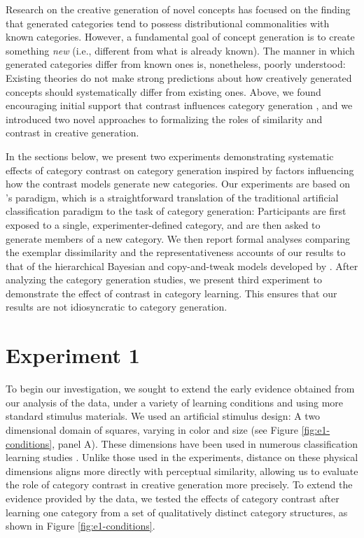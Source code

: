 \documentclass[12pt]{article}
\begin{document}
\begin{flushleft}
Research on the creative generation of novel concepts has focused on the finding
that generated categories tend to possess distributional commonalities with
known categories. However, a fundamental goal of concept generation is to create
something {\em new} (i.e., different from what is already known). The manner in
which generated categories differ from known ones is, nonetheless, poorly
understood: Existing theories do not make strong predictions about how
creatively generated concepts should systematically differ from existing ones.
Above, we found encouraging initial support that contrast influences category
generation \citep[][Experiment 3]{jern2013probabilistic}, and we introduced two
novel approaches to formalizing the roles of similarity and contrast in creative
generation.

In the sections below, we present two experiments demonstrating systematic
effects of category contrast on category generation inspired by factors
influencing how the contrast models generate new categories. Our experiments are
based on \cite{jern2013probabilistic}'s paradigm, which is a straightforward
translation of the traditional artificial classification paradigm to the task of
category generation: Participants are first exposed to a single,
experimenter-defined category, and are then asked to generate members of a new
category. We then report formal analyses comparing the exemplar dissimilarity
and the representativeness accounts of our results to that of the hierarchical
Bayesian and copy-and-tweak models developed by \cite{jern2013probabilistic}.
After analyzing the category generation studies, we present third experiment to
demonstrate the effect of contrast in category learning. This ensures that our
results are not idiosyncratic to category generation.

\section{Experiment 1}

To begin our investigation, we sought to extend the early evidence obtained from
our analysis of the \cite{jern2013probabilistic} data, under a variety of
learning conditions and using more standard stimulus materials. We used an
artificial stimulus design: A two dimensional domain of squares, varying in
color and size (see Figure \ref{fig:e1-conditions}, panel A). These dimensions
have been used in numerous classification learning studies
\cite[e.g.,][]{conaway2016similar,conaway2016generalization,shepard1961learning,nosofsky1994comparing}.
Unlike those used in the \cite{jern2013probabilistic} experiments, distance on
these physical dimensions aligns more directly with perceptual similarity,
allowing us to evaluate the role of category contrast in creative generation
more precisely. To extend the evidence provided by the
\cite{jern2013probabilistic} data, we tested the effects of category contrast
after learning one category from a set of qualitatively distinct category
structures, as shown in Figure \ref{fig:e1-conditions}.


\end{flushleft}
\end{document}
